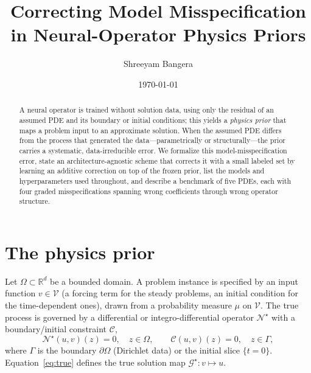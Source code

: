 \documentclass[11pt]{article}
\title{Correcting Model Misspecification in Neural-Operator Physics Priors}
\author{Shreeyam Bangera}
\date{\today}
\newcommand{\R}{\mathbb{R}}
\newcommand{\dom}{\Omega}
\newcommand{\bdry}{\partial\Omega}
\newcommand{\Gtrue}{\mathcal{G}^{\star}}
\newcommand{\Ntrue}{\mathcal{N}^{\star}}
\begin{document}
\maketitle

\begin{abstract}
A neural operator is trained without solution data, using only the residual of an assumed PDE
and its boundary or initial conditions; this yields a \emph{physics prior} that maps a problem
input to an approximate solution. When the assumed PDE differs from the process that generated
the data---parametrically or structurally---the prior carries a systematic, data-irreducible
error. We formalize this model-misspecification error, state an architecture-agnostic scheme
that corrects it with a small labeled set by learning an additive correction on top of the
frozen prior, list the models and hyperparameters used throughout, and describe a benchmark of
five PDEs, each with four graded misspecifications spanning wrong coefficients through wrong
operator structure.
\end{abstract}

\section{The physics prior}
\label{sec:setup}

Let $\dom\subset\R^{d}$ be a bounded domain. A problem instance is specified by an input
function $v\in\mathcal{V}$ (a forcing term for the steady problems, an initial condition for the
time-dependent ones), drawn from a probability measure $\mu$ on $\mathcal{V}$. The true process
is governed by a differential or integro-differential operator $\Ntrue$ with a boundary/initial
constraint $\mathcal{C}$,
\begin{equation}
\label{eq:true}
\Ntrue\!\left(u, v\right)(z) = 0,\quad z\in\dom,
\qquad
\mathcal{C}\!\left(u, v\right)(z) = 0,\quad z\in\Gamma,
\end{equation}
where $\Gamma$ is the boundary $\bdry$ (Dirichlet data) or the initial slice $\{t=0\}$.
Equation~\eqref{eq:true} defines the true solution map $\Gtrue:v\mapsto u$.
\end{document}
